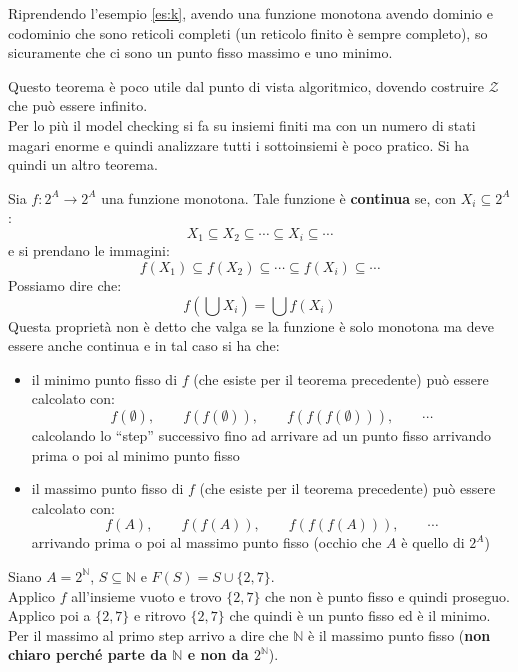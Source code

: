 \documentclass[a4paper,12pt, oneside]{book}
\begin{document}
\begin{esempio}
  Riprendendo l'esempio \ref{es:k}, avendo una funzione monotona avendo dominio
  e codominio che sono reticoli completi (un reticolo finito è sempre completo),
  so sicuramente che ci sono un punto fisso massimo e uno minimo.
\end{esempio}
Questo teorema è poco utile dal punto di vista algoritmico, dovendo costruire
$\mathcal{Z}$ che può essere infinito.\\
Per lo più il model checking si fa su insiemi finiti ma con un numero di stati
magari enorme e quindi analizzare tutti i sottoinsiemi è poco pratico. Si ha
quindi un altro teorema.
\begin{teorema}[di Kleene]
  Sia $f:2^A\to 2^A$ una funzione monotona. Tale funzione è \textbf{continua}
  se, con $X_i\subseteq 2^A$:
  \[X_1\subseteq X_2\subseteq\cdots\subseteq X_i\subseteq\cdots\]
  e si prendano le immagini:
  \[f(X_1)\subseteq f(X_2)\subseteq\cdots\subseteq f(X_i)\subseteq\cdots\]
  Possiamo dire che:
  \[f\left(\bigcup X_i\right)=\bigcup f(X_i)\]
  Questa proprietà non è detto che valga se la funzione è solo monotona ma deve
  essere anche continua e in tal caso si ha che:
  \begin{itemize}
    \item il minimo punto fisso di $f$ (che esiste per il teorema precedente)
    può essere calcolato con:
    \[f(\emptyset),\qquad f(f(\emptyset)),\qquad f(f(f(\emptyset))),
      \qquad\cdots\]
    calcolando lo ``step'' successivo fino ad arrivare ad un punto fisso
    arrivando prima o poi al minimo punto fisso 
    \item il massimo punto fisso di $f$ (che esiste per il teorema precedente)
    può essere calcolato con:
    \[f(A),\qquad f(f(A)),\qquad f(f(f(A))),\qquad\cdots\]
    arrivando prima o poi al massimo punto fisso (occhio che $A$ è quello di
    $2^A$) 
  \end{itemize}
\end{teorema}
\begin{esempio}
  Siano $A=2^{\mathbb{N}}$, $S\subseteq\mathbb{N}$ e $F(S)=S\cup \{2,7\}$.\\
  Applico $f$ all'insieme vuoto e trovo $\{2,7\}$ che non è punto fisso e quindi
  proseguo. Applico poi a $\{2,7\}$ e ritrovo $\{2,7\}$ che quindi è un punto
  fisso ed è il minimo. Per il massimo al primo step arrivo a dire che
  $\mathbb{N}$ è il massimo punto fisso (\textbf{non chiaro perché parte da
    $\mathbb{N}$ e non da $2^{\mathbb{N}}$}).  
\end{esempio}
\end{document}
